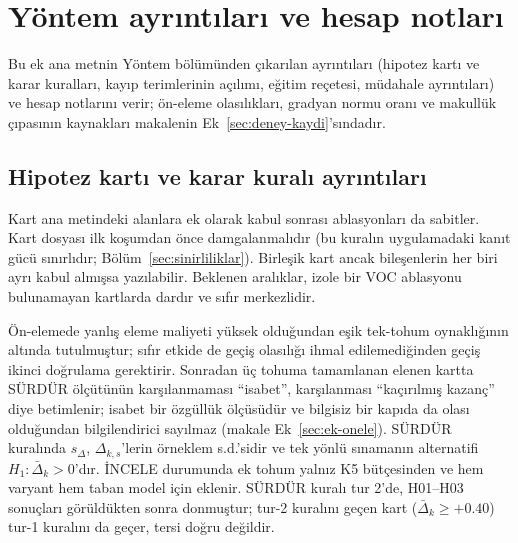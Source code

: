 \setcounter{table}{0}\setcounter{figure}{0}
\section{Yöntem ayrıntıları ve hesap notları}\label{sec:ek-hesap}

Bu ek ana metnin Yöntem bölümünden çıkarılan ayrıntıları (hipotez kartı ve karar kuralları, kayıp terimlerinin açılımı, eğitim reçetesi, müdahale ayrıntıları) ve hesap notlarını verir; ön-eleme olasılıkları, gradyan normu oranı ve makullük çıpasının kaynakları makalenin Ek~\ref{sec:deney-kaydi}'sındadır.

\subsection{Hipotez kartı ve karar kuralı ayrıntıları}\label{sec:ek-kart}
Kart ana metindeki alanlara ek olarak kabul sonrası ablasyonları da sabitler. Kart dosyası ilk koşumdan önce damgalanmalıdır (bu kuralın uygulamadaki kanıt gücü sınırlıdır; Bölüm~\ref{sec:sinirliliklar}). Birleşik kart ancak bileşenlerin her biri ayrı kabul almışsa yazılabilir. Beklenen aralıklar, izole bir VOC ablasyonu bulunamayan kartlarda dardır ve sıfır merkezlidir.

Ön-elemede yanlış eleme maliyeti yüksek olduğundan eşik tek-tohum oynaklığının altında tutulmuştur; sıfır etkide de geçiş olasılığı ihmal edilemediğinden geçiş ikinci doğrulama gerektirir. Sonradan üç tohuma tamamlanan elenen kartta SÜRDÜR ölçütünün karşılanmaması ``isabet'', karşılanması ``kaçırılmış kazanç'' diye betimlenir; isabet bir özgüllük ölçüsüdür ve bilgisiz bir kapıda da olası olduğundan bilgilendirici sayılmaz (makale Ek~\ref{sec:ek-onele}). SÜRDÜR kuralında $s_\Delta$, $\Delta_{k,s}$'lerin örneklem s.d.'sidir ve tek yönlü sınamanın alternatifi $H_1:\bar\Delta_k>0$'dır. İNCELE durumunda ek tohum yalnız K5 bütçesinden ve hem varyant hem taban model için eklenir. SÜRDÜR kuralı tur 2'de, H01--H03 sonuçları görüldükten sonra donmuştur; tur-2 kuralını geçen kart ($\bar\Delta_k\ge+0.40$) tur-1 kuralını da geçer, tersi doğru değildir.

